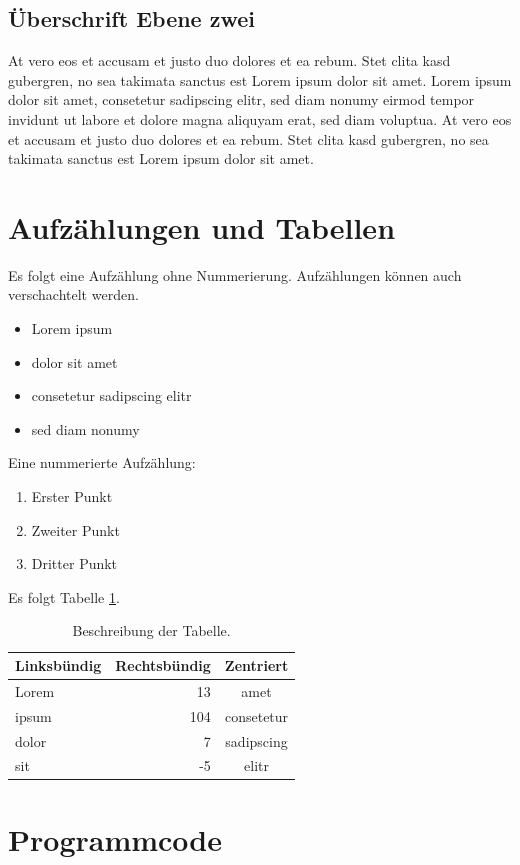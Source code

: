 \documentclass[a4paper, twoside]{IEEEtran}
\begin{document}
\subsection{Überschrift Ebene zwei}

At vero eos et accusam et justo duo dolores et ea rebum. Stet clita kasd gubergren, no sea takimata sanctus est Lorem ipsum dolor sit amet. Lorem ipsum dolor sit amet, consetetur sadipscing elitr, sed diam nonumy eirmod tempor invidunt ut labore et dolore magna aliquyam erat, sed diam voluptua. At vero eos et accusam et justo duo dolores et ea rebum. Stet clita kasd gubergren, no sea takimata sanctus est Lorem ipsum dolor sit amet.

\section{Aufzählungen und Tabellen}

Es folgt eine Aufzählung ohne Nummerierung. Aufzählungen können auch verschachtelt werden.

\begin{itemize}
\item Lorem ipsum
\item dolor sit amet
\item consetetur sadipscing elitr
\item sed diam nonumy
\end{itemize}
Eine nummerierte Aufzählung:

\begin{enumerate}
\item Erster Punkt
\item Zweiter Punkt
\item Dritter Punkt
\end{enumerate}
Es folgt Tabelle \ref{tabelle1}.

\begin{table}[htbp]
\centering
\caption{Beschreibung der Tabelle.}
\label{tabelle1}
\begin{tabular}{lrc}
\toprule
Linksbündig & Rechtsbündig & Zentriert \\
\midrule
Lorem &  13 & amet \\
ipsum & 104 & consetetur \\
dolor &   7 & sadipscing \\
sit   &  -5 & elitr \\
\bottomrule
\end{tabular}
\end{table}

\section{Programmcode}
\end{document}
